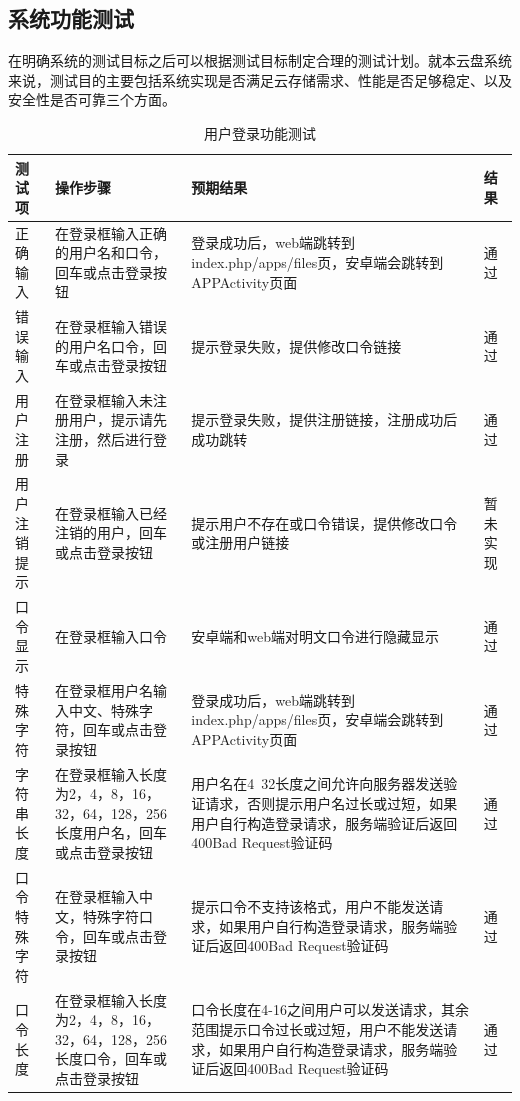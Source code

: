 \subsection{系统功能测试}
在明确系统的测试目标之后可以根据测试目标制定合理的测试计划。就本云盘系统来说，测试目的主要包括系统实现是否满足云存储需求、性能是否足够稳定、以及安全性是否可靠三个方面。
\begin{table}[hp]\center
    \caption{用户登录功能测试}
    \begin{tabular}{p{2cm}p{5.5cm}p{5.5cm}p{1cm}}
        \toprule
        测试项 &  操作步骤 & 预期结果 & 结果 \\
        \midrule    
        正确输入            & 在登录框输入正确的用户名和口令，回车或点击登录按钮  & 登录成功后，web端跳转到index.php/apps/files页，安卓端会跳转到APPActivity页面 & 通过 \\                                        
        错误输入            & 在登录框输入错误的用户名口令，回车或点击登录按钮 & 提示登录失败，提供修改口令链接 & 通过 \\
        用户注册            & 在登录框输入未注册用户，提示请先注册，然后进行登录      & 提示登录失败，提供注册链接，注册成功后成功跳转 & 通过 \\
        用户注销提示        & 在登录框输入已经注销的用户，回车或点击登录按钮 & 提示用户不存在或口令错误，提供修改口令或注册用户链接 & 暂未实现 \\
        口令显示            & 在登录框输入口令 & 安卓端和web端对明文口令进行隐藏显示 & 通过 \\
        特殊字符            & 在登录框用户名输入中文、特殊字符，回车或点击登录按钮  & 登录成功后，web端跳转到index.php/apps/files页，安卓端会跳转到APPActivity页面 & 通过 \\                                    
        字符串长度          & 在登录框输入长度为2，4，8，16，32，64，128，256长度用户名，回车或点击登录按钮 & 用户名在4~32长度之间允许向服务器发送验证请求，否则提示用户名过长或过短，如果用户自行构造登录请求，服务端验证后返回400Bad Request验证码 & 通过 \\
        口令特殊字符        & 在登录框输入中文，特殊字符口令，回车或点击登录按钮 & 提示口令不支持该格式，用户不能发送请求，如果用户自行构造登录请求，服务端验证后返回400Bad Request验证码 & 通过 \\
        口令长度            & 在登录框输入长度为2，4，8，16，32，64，128，256长度口令，回车或点击登录按钮 & 口令长度在4-16之间用户可以发送请求，其余范围提示口令过长或过短，用户不能发送请求，如果用户自行构造登录请求，服务端验证后返回400Bad Request验证码 & 通过 \\

\end{tabular}
\end{table}
